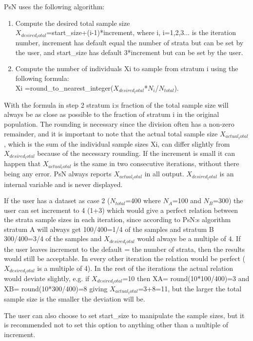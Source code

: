 PsN uses the following algorithm:
\begin{enumerate}
	\item Compute the desired total sample size\\
	 $X_{desired_total}$=start\_size+(i-1)*increment, where i, i=1,2,3... 	is the iteration number, increment has default equal the number of strata but can be set by the 	user, and start\_size has default 3*increment but can be set by the user.
	\item Compute the number of individuals Xi to sample from stratum i using the following formula:\\
	Xi =round\_to\_nearest\_integer($X_{desired_total}$*$N_i$/$N_{total}$). 
\end{enumerate}
With the formula in step 2 stratum i:s fraction of the total sample size will always be as close as possible to the fraction of stratum i in the original population. The rounding is necessary since the division often has a non-zero remainder, and it is important to note that the actual total sample size $X_{actual_total}$, which is the sum of the individual sample sizes Xi, can differ slightly from $X_{desired_total}$ because of the necessary rounding. If the increment is small it can happen that $X_{actual_total}$ is the same in two consecutive iterations, without there being any error. PsN always reports $X_{actual_total}$ in all output. $X_{desired_total}$ is an internal variable and is never displayed.

If the user has a dataset as case 2 ($N_{total}$=400 where $N_A$=100 and $N_B$=300) the user can set increment to 4 (1+3) which would give a perfect relation between the strata sample sizes in each iteration, since according to PsN:s algorithm stratum A will always get 100/400=1/4 of the samples and stratum B 300/400=3/4 of the samples and $X_{desired_total}$ would always be a multiple of 4. If the user leaves increment to the default = the number of strata, then the results would still be acceptable. In every other iteration the relation would be perfect ( $X_{desired_total}$ is a multiple of 4). In the rest of the iterations the actual relation would deviate slightly, e.g. if $X_{desired_total}$=10 then XA= round(10*100/400)=3 and XB= round(10*300/400)=8 giving $X_{actual_total}$=3+8=11, but the larger the total sample size is the smaller the deviation will be. 

The user can also choose to set start\_size to manipulate the sample sizes, but it is recommended not to set this option to anything other than a multiple of increment.

